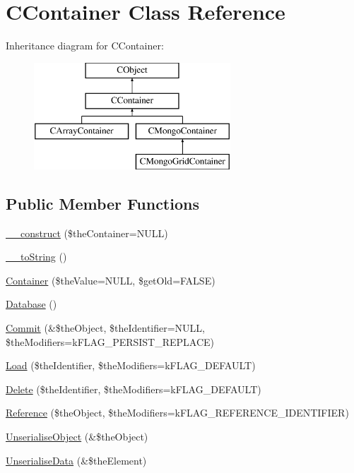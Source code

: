 \hypertarget{class_c_container}{\section{C\-Container Class Reference}
\label{class_c_container}
}
Inheritance diagram for C\-Container\-:\begin{figure}[H]
\begin{center}
\leavevmode
\includegraphics[height=4.000000cm]{class_c_container}
\end{center}
\end{figure}
\subsection*{Public Member Functions}
\begin{DoxyCompactItemize}
\item 
\hyperlink{class_c_container_af2fc42b4d7b5f71e0f127c941440b1aa}{\-\_\-\-\_\-construct} (\$the\-Container=N\-U\-L\-L)
\item 
\hyperlink{class_c_container_aa1d6ed5052f55cdffcf6445968f203ed}{\-\_\-\-\_\-to\-String} ()
\item 
\hyperlink{class_c_container_a7d10fa70dfa381cb95e66c265e2ca113}{Container} (\$the\-Value=N\-U\-L\-L, \$get\-Old=F\-A\-L\-S\-E)
\item 
\hyperlink{class_c_container_a0d691b62d9b70b924e24a332931ce9d1}{Database} ()
\item 
\hyperlink{class_c_container_a4847dc676d1f7704e75f8981e927508a}{Commit} (\&\$the\-Object, \$the\-Identifier=N\-U\-L\-L, \$the\-Modifiers=k\-F\-L\-A\-G\-\_\-\-P\-E\-R\-S\-I\-S\-T\-\_\-\-R\-E\-P\-L\-A\-C\-E)
\item 
\hyperlink{class_c_container_a48db96aa6bbf15d0bfc15725616b7154}{Load} (\$the\-Identifier, \$the\-Modifiers=k\-F\-L\-A\-G\-\_\-\-D\-E\-F\-A\-U\-L\-T)
\item 
\hyperlink{class_c_container_aa91ec2f4624a2ebfb74668f274139329}{Delete} (\$the\-Identifier, \$the\-Modifiers=k\-F\-L\-A\-G\-\_\-\-D\-E\-F\-A\-U\-L\-T)
\item 
\hyperlink{class_c_container_a1486a3cb34d24ff1c3028ad4360b5dc6}{Reference} (\$the\-Object, \$the\-Modifiers=k\-F\-L\-A\-G\-\_\-\-R\-E\-F\-E\-R\-E\-N\-C\-E\-\_\-\-I\-D\-E\-N\-T\-I\-F\-I\-E\-R)
\item 
\hyperlink{class_c_container_aa339d3c4c9b011713176a89fe9c7783d}{Unserialise\-Object} (\&\$the\-Object)
\item 
\hyperlink{class_c_container_a09d585e2a9809221a42d52d7520c9cbf}{Unserialise\-Data} (\&\$the\-Element)
\end{DoxyCompactItemize}
